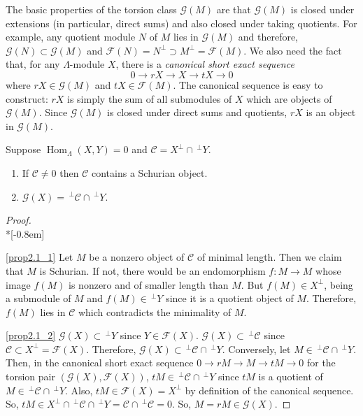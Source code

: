 \documentclass[ALCO,ThmDefs,Unicode,epreuves]{cedram}
\DeclareMathOperator{\Hom}{Hom}%
\newcommand{\cC}{\ensuremath{{\mathcal{C}}}}
\newcommand{\cF}{\ensuremath{{\mathcal{F}}}}
\newcommand{\cG}{\ensuremath{{\mathcal{G}}}}
\begin{document}
The basic properties of the {torsion class} $\cG(M)$ are that $\cG(M)$ is closed under extensions (in particular, direct sums) and also closed under taking quotients. For example, any quotient module $N$ of $M$ lies in $\cG(M)$ and therefore, $\cG(N)\subset\cG(M)$ and $\cF(N)=N^\perp\supset M^\perp=\cF(M)$. We also need the fact that, for any $\Lambda$-module $X$, there is a \emph{canonical short exact sequence}
\[
	0\to rX\to X\to tX\to 0
\]
where $rX\in \cG(M)$ and $tX\in \cF(M)$. The canonical sequence is easy to construct: $rX$ is simply the sum of all submodules of $X$ which are objects of $\cG(M)$. Since $\cG(M)$ is closed under direct sums and quotients, $rX$ is an object in $\cG(M)$.




\begin{prop}\label{prop: HN stratification with 3 strata}
Suppose $\Hom_\Lambda(X,Y)=0$ and $\cC=X^\perp\cap\,^\perp Y$. 
\begin{enumerate}
\item\label{prop2.1_1} If $\cC\neq0$ then $\cC$ contains a Schurian object.
\item\label{prop2.1_2} $\cG(X)=\,^\perp \cC\cap\,^\perp Y$.
\end{enumerate}
\end{prop}

\begin{proof} \ \\*[-0.8em]

 \eqref{prop2.1_1} Let $M$ be a nonzero object of $\cC$ of minimal length. Then we claim that $M$ is Schurian. If not, there would be an endomorphism $f:M\to M$ whose image $f(M)$ is nonzero and of smaller length than $M$. But $f(M)\in X^\perp$, being a submodule of $M$ and $f(M)\in \,^\perp Y$ since it is a quotient object of $M$. Therefore, $f(M)$ lies in $\cC$ which contradicts the minimality of $M$.

\eqref{prop2.1_2} $\cG(X)\subset \,^\perp Y$ since $Y\in \cF(X)$. $\cG(X)\subset \,^\perp \cC$ since $\cC\subset  X^\perp=\cF(X)$. Therefore, $\cG(X)\subset \,^\perp\cC\cap \,^\perp Y$. Conversely, let $M\in \,^\perp \cC\cap\,^\perp Y$. Then, in the canonical short exact sequence $0\to rM\to M\to tM\to 0$ for the torsion pair $(\cG(X),\cF(X))$, $tM\in  \,^\perp \cC\cap\,^\perp Y$ since $tM$ is a quotient of $M\in \,^\perp \cC\cap\,^\perp Y$. Also, $tM\in \cF(X)= X^\perp$ by definition of the canonical sequence. So, $tM\in X^\perp\cap \,^\perp\cC\cap\,^\perp Y=\cC\cap \,^\perp \cC=0$. So, $M=rM\in\cG(X)$.
\end{proof}
\end{document}
